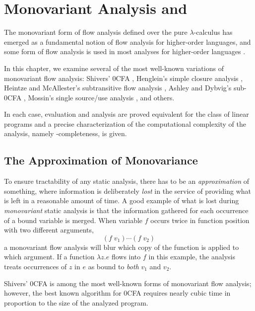 \chapter{Monovariant Analysis and \ptime}
\label{chapter-0cfa}

The monovariant form of flow analysis defined over the pure
$\lambda$-calculus has emerged as a fundamental notion of flow
analysis for higher-order languages, and some form of flow analysis is
used in most analyses for higher-order languages
\cite{heintze-mcallester-pldi97}.

In this chapter, we examine several of the most well-known variations
of monovariant flow analysis: Shivers' 0CFA
\citeyearpar{shivers-pldi88}, Henglein's simple closure analysis
\citeyearpar{henglein92d}, Heintze and McAllester's subtransitive flow
analysis \citeyearpar{heintze-mcallester-pldi97}, Ashley and Dybvig's
sub-0CFA \citeyearpar{ashley-dybvig-toplas98}, Mossin's single
source/use analysis \citeyearpar{mossin-njc98}, and others.

In each case, evaluation and analysis are proved equivalent for the
class of linear programs and a precise characterization of the
computational complexity of the analysis, namely \ptime-completeness,
is given.

\section{The Approximation of Monovariance}

To ensure tractability of any static analysis, there has to be an {\em
  approximation} of something, where information is deliberately {\em
  lost} in the service of providing what is left in a reasonable
amount of time.  A good example of what is lost during {\em
  monovariant} static analysis is that the information gathered for
each occurrence of a bound variable is merged.  When variable $f$
occurs twice in function position with two different arguments,
\begin{displaymath}
(f\;v_1) \cdots (f\;v_2)
\end{displaymath}
a monovariant flow analysis will blur which copy of the function is
applied to which argument.  If a function $\lambda z.e$ flows into $f$
in this example, the analysis treats occurrences of $z$ in $e$ as
bound to {\em both} $v_1$ and
$v_2$. 

Shivers' 0CFA is among the most well-known forms of monovariant flow
analysis; however, the best known algorithm for 0CFA requires nearly
cubic time in proportion to the size of the analyzed program.

